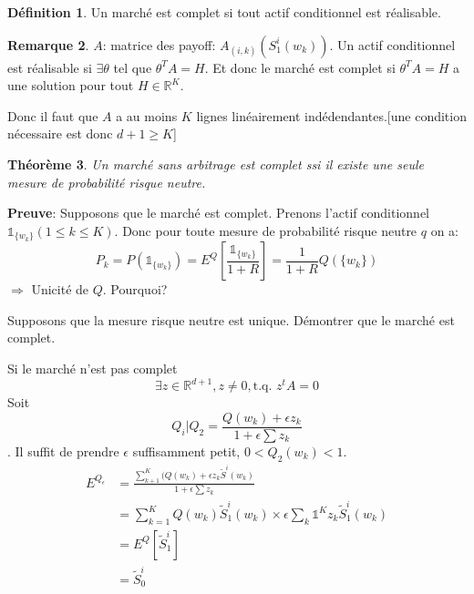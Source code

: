 \documentclass{article}
\theoremstyle{plain}
\newtheorem{thm}{Th\'eor\`eme}[section]
\theoremstyle{definition}
\newtheorem{defn}[thm]{D\'efinition}
\newtheorem{remq}[thm]{Remarque}
\begin{document}
\begin{defn}
	Un march\'e est complet si tout actif conditionnel est r\'ealisable.
\end{defn}

\begin{remq}
	$A$: matrice des payoff: $A_{(i,k)}(S_1^i(w_k))$. Un actif conditionnel est r\'ealisable si $\exists \theta$ tel que $\theta^T A=H$. Et donc le march\'e est complet si $\theta^T A=H$ a une solution pour tout $H\in \mathbb{R}^K$.	
\end{remq}


Donc il faut que $A$ a au moins $K$ lignes lin\'eairement ind\'edendantes.[une condition n\'ecessaire est donc $d+1\geq K$]

\begin{thm}
	Un march\'e sans arbitrage est complet ssi il existe une seule mesure de probabilit\'e risque neutre.
\end{thm}

\textbf{Preuve}: Supposons que le march\'e est complet. Prenons l'actif conditionnel $\mathds{1}_{\{w_k\}}(1\leq k\leq K)$. Donc pour toute mesure de probabilit\'e risque neutre $q$ on a:
\begin{equation}
P_k=P(\mathds{1}_{\{w_k\}})=E^Q[\frac{\mathds{1}_{\{w_k\}}}{1+R}]=\frac{1}{1+R}Q(\{w_k\})
\end{equation}
$\Rightarrow$ Unicit\'e de $Q$. {\color{red} Pourquoi?}

Supposons que la mesure risque neutre est unique. D\'emontrer que le march\'e est complet.

Si le march\'e n'est pas complet 
\begin{equation}
	\exists z\in\mathbb{R}^{d+1}, z\neq 0, \text{t.q. } z^tA=0
\end{equation}
Soit
\begin{equation}
	Q_i|Q_2=\frac{Q(w_k)+\epsilon z_k}{1+\epsilon \sum z_k}
\end{equation}. 
Il suffit de prendre $\epsilon$ suffisamment petit, $0<Q_2(w_k)<1$.
\begin{equation}
	\begin{split}
		E^{Q_\epsilon}&=\frac{\sum_{k+1}^K (Q(w_k)+\epsilon z_k \tilde{S}^i(w_k)}{1+\epsilon \sum z_k}\\
		&=\sum_{k=1}^K Q(w_k) \tilde{S}_1^i(w_k)\times\epsilon \sum_k \mathds{1}^{K} z_k \tilde{S}_1^i (w_k)\\
		&=E^Q[\tilde{S}_1^i]\\ 
		&=\tilde{S}_0^i
	\end{split}
\end{equation}
\end{document}
